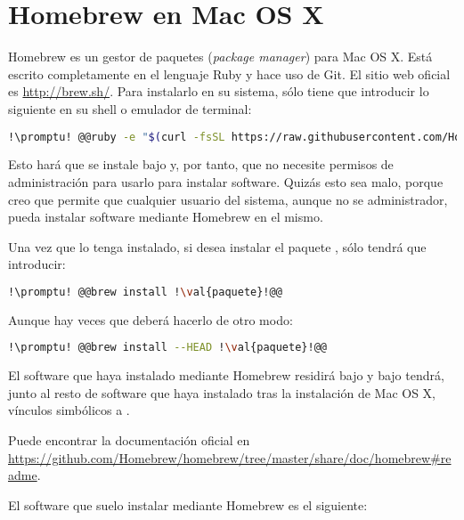 \section{Homebrew en Mac OS X}\label{sec:homebrew-m}
Homebrew es un gestor de paquetes (\foreignlanguage{english}{\textit{package manager}}) para Mac OS X. Está
escrito completamente en el lenguaje Ruby y hace uso de Git. El sitio web oficial es \url{http://brew.sh/}. Para
instalarlo en su sistema, sólo tiene que introducir lo siguiente en su shell o emulador de terminal:

\begin{lstlisting}[gobble=2,language=bash,style=bashinteract,escapechar=!]
  !\promptu! @@ruby -e "$(curl -fsSL https://raw.githubusercontent.com/Homebrew/install/master/install)"@@
\end{lstlisting}

\noindent Esto hará que se instale bajo  y, por tanto, que no necesite permisos de
administración para usarlo para instalar software. Quizás esto sea malo, porque creo que permite que cualquier
usuario del sistema, aunque no se administrador, pueda instalar software mediante Homebrew en el mismo.

Una vez que lo tenga instalado, si desea instalar el paquete , sólo tendrá que introducir:

\begin{lstlisting}[gobble=2,language=bash,style=bashinteract,escapechar=!]
  !\promptu! @@brew install !\val{paquete}!@@
\end{lstlisting}

Aunque hay veces que deberá hacerlo de otro modo:

\begin{lstlisting}[gobble=2,language=bash,style=bashinteract,escapechar=!]
  !\promptu! @@brew install --HEAD !\val{paquete}!@@
\end{lstlisting}

El software que haya instalado mediante Homebrew residirá bajo  y bajo
 tendrá, junto al resto de software que haya instalado tras la instalación de Mac OS X,
vínculos simbólicos a .

Puede encontrar la documentación oficial en
\url{https://github.com/Homebrew/homebrew/tree/master/share/doc/homebrew#readme}.

El software que suelo instalar mediante Homebrew es el siguiente:

